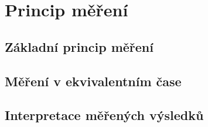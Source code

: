 \chapter{Princip měření}

\section{Základní princip měření}

\section{Měření v ekvivalentním čase}

\section{Interpretace měřených výsledků}



